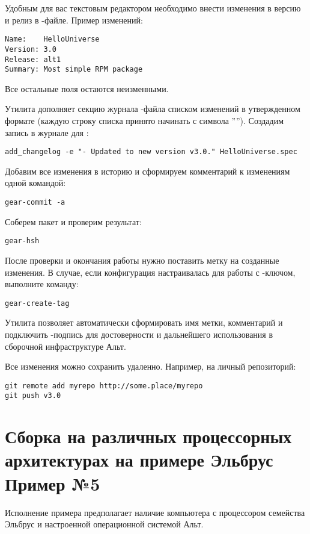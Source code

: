 Удобным для вас текстовым редактором необходимо внести изменения в версию и релиз
в -файле. Пример изменений:
\begin{verbatim}
Name:    HelloUniverse
Version: 3.0
Release: alt1
Summary: Most simple RPM package
\end{verbatim}
Все остальные поля остаются неизменными.

Утилита  дополняет секцию журнала -файла
списком изменений в утвержденном формате (каждую строку списка принято начинать
с символа ''\Sys{-}''). Создадим запись в журнале для :
\begin{verbatim}
add_changelog -e "- Updated to new version v3.0." HelloUniverse.spec
\end{verbatim}

Добавим все изменения в историю  и сформируем комментарий к изменениям
одной командой:
\begin{verbatim}
gear-commit -a
\end{verbatim}

Соберем пакет и проверим результат:
\begin{verbatim}
gear-hsh
\end{verbatim}

После проверки и окончания работы нужно поставить метку на созданные изменения.
В случае, если конфигурация  настраивалась для работы с -ключом,
выполните команду:
\begin{verbatim}
gear-create-tag
\end{verbatim}
Утилита  позволяет автоматически сформировать имя метки, комментарий
и подключить -подпись для достоверности и дальнейшего использования в
сборочной инфраструктуре Альт.

Все изменения можно сохранить удаленно. Например, на личный репозиторий:
\begin{verbatim}
git remote add myrepo http://some.place/myrepo
git push v3.0
\end{verbatim}

\section{Сборка на различных процессорных архитектурах на примере Эльбрус \textbf{Пример №5}}

Исполнение примера предполагает наличие компьютера с процессором семейства
Эльбрус и настроенной операционной системой Альт.

